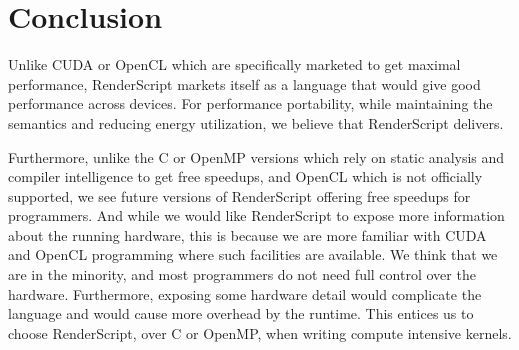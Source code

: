 \section{Conclusion}

Unlike CUDA or OpenCL which are specifically marketed to get maximal performance, 
RenderScript markets itself as a language that would give good performance across devices.
For performance portability, while maintaining the semantics and reducing energy utilization,
	we believe that RenderScript delivers.

Furthermore, unlike the C or OpenMP versions which rely on static analysis and compiler
	intelligence to get free speedups, and OpenCL which is not officially supported,
	we see future versions of RenderScript offering free speedups for programmers.
And while we would like RenderScript to expose more information about the running hardware,
	this is because we are more familiar with CUDA and OpenCL programming where such facilities
	are available.
We think that we are in the minority, and most programmers do not need full control over the hardware.
Furthermore, exposing some hardware detail would complicate the language and would cause
	more overhead by the runtime.
This entices us to choose RenderScript, over C or OpenMP, when writing compute intensive
	kernels.
